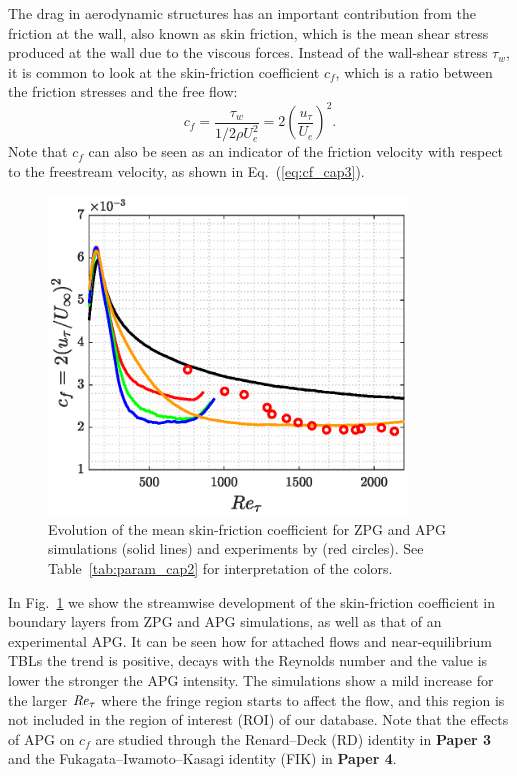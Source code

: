 The drag in aerodynamic structures has an important contribution from the friction at the wall, also known as skin friction, which is the mean shear stress produced at the wall due to the viscous forces.
Instead of the wall-shear stress $\tau_w$, it is common to look at the skin-friction coefficient $c_f$, which is a ratio between the friction stresses and the free flow:
\begin{equation}
    \label{eq:cf_cap3}
    c_f = \frac{\tau_w}{1/2 \rho U_e^2} = 2\left( \frac{u_{\tau}}{U_e} \right)^2 .
\end{equation}
Note that $c_f$ can also be seen as an indicator of the friction velocity with respect to the freestream velocity, as shown in Eq.~(\ref{eq:cf_cap3}).
\begin{figure}
    \centering
    \includegraphics[width=0.85\textwidth]{imgs/stats/cf_Retau.eps}
    \caption{Evolution of the mean skin-friction coefficient for ZPG and APG simulations (solid lines) and experiments by \cite{MTL_expSANMIGUEL} (red circles). See Table~\ref{tab:param_cap2} for interpretation of the colors.}
    \label{fig:cap3_evol_cf}
\end{figure}
In Fig.~\ref{fig:cap3_evol_cf} we show the streamwise development of the skin-friction coefficient in boundary layers from ZPG and APG simulations, as well as that of an experimental APG.
It can be seen how for attached flows and near-equilibrium TBLs the trend is positive, decays with the Reynolds number and the value is lower the stronger the APG intensity.
The simulations show a mild increase for the larger $\mbox{\textit{Re}}_{\tau}$ where the fringe region starts to affect the flow, and this region is not included in the region of interest (ROI) of our database.
Note that the effects of APG on $c_f$ are studied through the Renard--Deck (RD) \citep{Renard2016} identity in \textbf{Paper 3} and the Fukagata--Iwamoto--Kasagi identity (FIK) \citep{Fukagata2002} in \textbf{Paper 4}.

